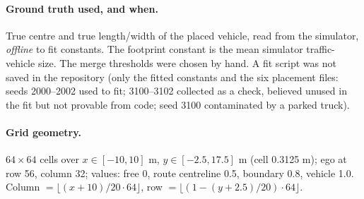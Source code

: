 \documentclass[11pt,a4paper]{article}
\begin{document}
\paragraph{Ground truth used, and when.} True centre and true length/width of the placed vehicle, read from the simulator, \emph{offline} to fit constants. The footprint constant is the mean simulator traffic-vehicle size. The merge thresholds were chosen by hand. A fit script was not saved in the repository (only the fitted constants and the six placement files: seeds 2000--2002 used to fit; 3100--3102 collected as a check, believed unused in the fit but not provable from code; seed 3100 contaminated by a parked truck).
\paragraph{Grid geometry.} $64\times64$ cells over $x\in[-10,10]$ m, $y\in[-2.5,17.5]$ m (cell 0.3125 m); ego at row 56, column 32; values: free 0, route centreline 0.5, boundary 0.8, vehicle 1.0. Column $=\lfloor (x+10)/20\cdot64\rfloor$, row $=\lfloor(1-(y+2.5)/20)\cdot64\rfloor$.
\end{document}
